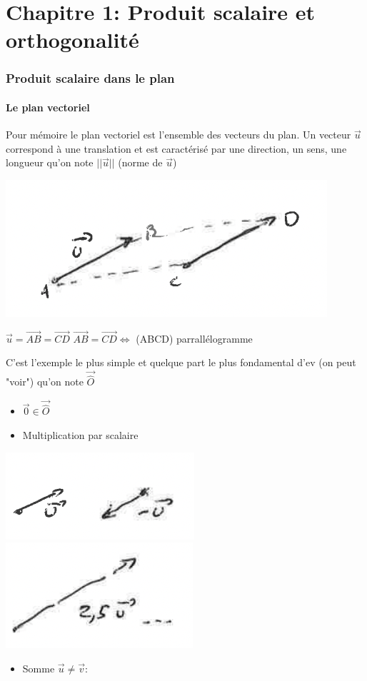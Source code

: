 \documentclass{article}
\author{Frederic Becerril}
\begin{document}
\part*{Chapitre 1: Produit scalaire et orthogonalité}

\section{Produit scalaire dans le plan}

\subsection{Le plan vectoriel}

Pour mémoire le plan vectoriel est l'ensemble des vecteurs du plan.
Un vecteur $\vec{u}$ correspond à une translation et est caractérisé
par une direction, un sens, une longueur qu'on note $||\vec{u}||$
(norme de $\vec{u}$)

\includegraphics{images/image01.png}

$\vec{u} = \overrightarrow{AB} = \overrightarrow{CD}$ \newline
$\overrightarrow{AB} = \overrightarrow{CD} \Leftrightarrow$ (ABCD) parrallélogramme

C'est l'exemple le plus simple et quelque part le plus fondamental d'ev (on peut "voir") qu'on note $\overrightarrow{\widehat{O}}$

\begin{itemize}

    \item $\vec{0} \in \overrightarrow{\widehat{O}}$
    \item Multiplication par scalaire 
\end{itemize}
\includegraphics{images/image03_1.png}
\includegraphics{images/image03_2.png}
\begin{itemize}
    \item Somme $\vec{u} \neq \vec{v}$:
\end{itemize}
\end{document}
